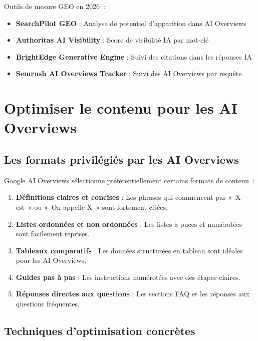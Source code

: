 \documentclass[12pt,a4paper,twoside]{report}
\begin{document}
\begin{toolsbox}
Outils de mesure GEO en 2026~:
\begin{itemize}
    \item \textbf{SearchPilot GEO} : Analyse de potentiel d'apparition dans AI Overviews
    \item \textbf{Authoritas AI Visibility} : Score de visibilité IA par mot-clé
    \item \textbf{BrightEdge Generative Engine} : Suivi des citations dans les réponses IA
    \item \textbf{Semrush AI Overviews Tracker} : Suivi des AI Overviews par requête
\end{itemize}
\end{toolsbox}

\section{Optimiser le contenu pour les AI Overviews}

\subsection{Les formats privilégiés par les AI Overviews}

Google AI Overviews sélectionne préférentiellement certains formats de contenu~:

\begin{enumerate}
    \item \textbf{Définitions claires et concises} : Les phrases qui commencent par «~X est~» ou «~On appelle X~» sont fortement citées.
    \item \textbf{Listes ordonnées et non ordonnées} : Les listes à puces et numérotées sont facilement reprises.
    \item \textbf{Tableaux comparatifs} : Les données structurées en tableau sont idéales pour les AI Overviews.
    \item \textbf{Guides pas à pas} : Les instructions numérotées avec des étapes claires.
    \item \textbf{Réponses directes aux questions} : Les sections FAQ et les réponses aux questions fréquentes.
\end{enumerate}

\subsection{Techniques d'optimisation concrètes}
\end{document}
